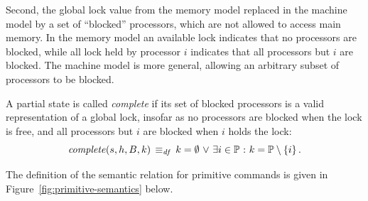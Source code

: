 \documentclass[11pt]{article}
\begin{document}
Second, the global lock value from the memory model replaced in the machine model by a set of ``blocked'' processors, which are not allowed to access main memory. In the memory model an available lock indicates that no processors are blocked, while all lock held by processor $i$ indicates that all processors but $i$ are blocked. The machine model is more general, allowing an arbitrary subset of processors to be blocked. 

A partial state is called \emph{complete} if its set of blocked processors is a valid representation of a global lock, insofar as no processors are blocked when the lock is free, and all processors but $i$ are blocked when $i$ holds the lock: \[ \mathit{complete}(s,h,B,k) \operatorname{\;\equiv_{\mathit{df}}\;} k = \operatorname{\emptyset} \operatorname{\,\vee\,} \exists i \in \mathbb{P} \operatorname{\,:\,} k = \mathbb{P} \setminus \left\lbrace i \right\rbrace.\]

The definition of the semantic relation for primitive commands is given in Figure~\ref{fig:primitive-semantics} below. 
\end{document}
